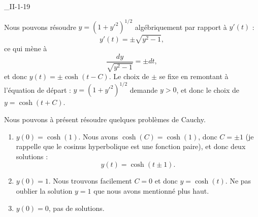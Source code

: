 \begin{corrige}{_II-1-19}
\begin{alternative}
	Nous pouvons résoudre $y=(1+y'^2)^{1/2}$ algébriquement par rapport à $y'(t)$ :
\begin{equation}
	y'(t)=\pm\sqrt{y^2-1},
\end{equation}
ce qui mène à
\begin{equation}
	\frac{ dy }{ \sqrt{y^2-1} }=\pm dt,
\end{equation}
et donc $y(t)=\pm\cosh(t-C)$. Le choix de $\pm$ se fixe en remontant à l'équation de départ : $y=(1+y'^2)^{1/2}$ demande $y>0$, et donc le choix de $y=\cosh(t+C)$. 
\end{alternative}

Nous pouvons à présent résoudre quelques problèmes de Cauchy.

\begin{enumerate}

\item 
$y(0)=\cosh(1)$. Nous avons $\cosh(C)=\cosh(1)$, donc $C=\pm 1$ (je rappelle que le cosinus hyperbolique est une fonction paire), et donc deux solutions :
\begin{equation}
	y(t)=\cosh(t\pm 1).
\end{equation}

\item
$y(0)=1$. Nous trouvons facilement $C=0$ et donc $y=\cosh(t)$. Ne pas oublier la solution $y=1$ que nous avons mentionné plus haut.

\item
$y(0)=0$, pas de solutions.

\end{enumerate}


\end{corrige}
